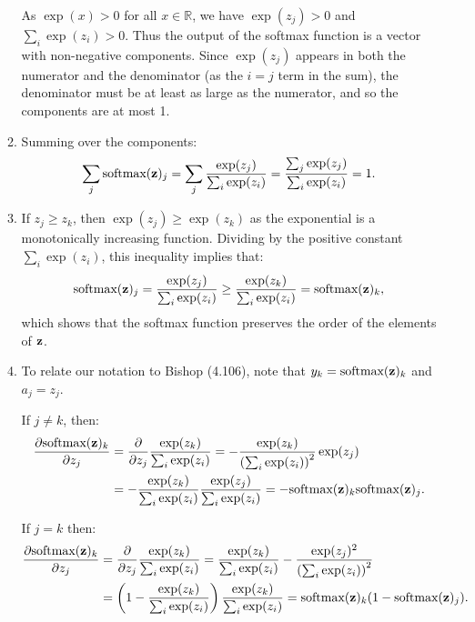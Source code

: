 \documentclass[12pt,letterpaper]{article}
\begin{document}
\begin{enumerate}
\begin{enumerate}
            As $\exp(x)>0$ for all $x\in\mathbb R$, we have $\exp(z_j)>0$ and $\sum_i \exp(z_i)>0$. Thus the output of the softmax function is a vector with non-negative components. Since $\exp(z_j)$ appears in both the numerator and the denominator (as the $i=j$ term in the sum), the denominator must be at least as large as the numerator, and so the components are at most 1.
            
            
            \item  Summing over the components:
            \[\sum_j \text{softmax}({\bf z})_j = \sum_j \frac{\exp(z_j)}{\sum_i \exp(z_i)} =  \frac{\sum_j\exp(z_j)}{\sum_i \exp(z_i)}  = 1.\]

            
            \item If $z_j\ge z_k$, then $\exp(z_j)\ge \exp(z_k)$ as the exponential is a monotonically increasing function. Dividing by the positive constant $\sum_i \exp(z_i)$, this inequality implies that:
            \[\text{softmax}({\bf z})_j = \frac{\exp(z_j)}{\sum_i \exp(z_i)} \ge \frac{\exp(z_k)}{\sum_i \exp(z_i)} = \text{softmax}({\bf z})_k,\]
            which shows that the softmax function preserves the order of the elements of ${\bf z}$.
            
  
          
            \item To relate our notation to Bishop (4.106), note that $y_k = \text{softmax}({\bf z})_k$ and $a_j = z_j$. 
            
            If $j\neq k$, then:
            \begin{align*}
            \frac{\partial \text{softmax}({\bf z})_k}{\partial z_j} &= \frac{\partial}{\partial z_j} \frac{\exp(z_k)}{\sum_i \exp(z_i)} = - \frac{\exp(z_k)}{\left(\sum_i \exp(z_i)\right)^2}\exp(z_j)\\& = -\frac{\exp(z_k)}{\sum_i \exp(z_i)} \frac{\exp(z_j)}{\sum_i \exp(z_i)} = -\text{softmax}({\bf z})_k \text{softmax}({\bf z})_j.
            \end{align*}
            
            If $j = k$ then:
            \begin{align*}
            \frac{\partial \text{softmax}({\bf z})_k}{\partial z_j} &= \frac{\partial}{\partial z_j} \frac{\exp(z_k)}{\sum_i \exp(z_i)} = \frac{\exp(z_k)}{\sum_i \exp(z_i)} - \frac{\exp(z_j)^2}{\left(\sum_i \exp(z_i)\right)^2}  \\&= \left(1 - \frac{\exp(z_k)}{\sum_i \exp(z_i)}\right)\frac{\exp(z_k)}{\sum_i \exp(z_i)} = \text{softmax}({\bf z})_k(1 - \text{softmax}({\bf z})_j).
            \end{align*}
            

\end{enumerate}
\end{enumerate}
\end{document}
